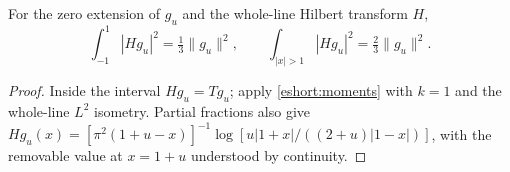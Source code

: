 \begin{corollary}\label{T10:cor:leak}
For the zero extension of $g_u$ and the whole-line Hilbert transform $H$,
\begin{equation}\label{eshort:leak}
 \int_{-1}^1|Hg_u|^2=\tfrac13\|g_u\|^2,\qquad
 \int_{|x|>1}|Hg_u|^2=\tfrac23\|g_u\|^2.
\end{equation}
\end{corollary}
\begin{proof}
Inside the interval $Hg_u=Tg_u$; apply \eqref{eshort:moments} with
$k=1$ and the whole-line $L^2$ isometry. Partial fractions also give
$Hg_u(x)=[\pi^2(1+u-x)]^{-1}\log[u|1+x|/((2+u)|1-x|)]$,
with the removable value at $x=1+u$ understood by continuity.
\end{proof}

